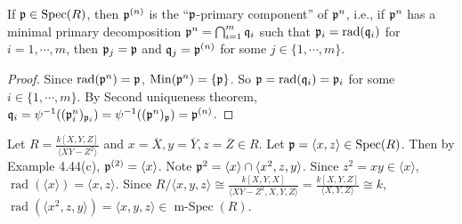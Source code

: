 \begin{proposition}
    If $\mathfrak{p} \in \operatorname{Spec}(R)$, then $\mathfrak{p}^{(n)}$ is the ``$\mathfrak{p}$-primary component'' of $\mathfrak{p}^{n}$, i.e., if $\mathfrak{p}^{n}$ has a minimal primary decomposition $\mathfrak{p}^{n} = \bigcap_{i=1}^{m} \mathfrak{q}_i$ such that $\mathfrak{p}_i = \operatorname{rad}(\mathfrak{q}_i)$ for $i = 1,\cdots,m$, then $\mathfrak{p}_j = \mathfrak{p}$ and $\mathfrak{q}_j = \mathfrak{p}^{(n)}$ for some $j \in \{1,\cdots,m\}$. 
\end{proposition}

\begin{proof}
    Since $\operatorname{rad}(\mathfrak{p}^{n}) = \mathfrak{p}$, $\operatorname{Min}(\mathfrak{p}^{n}) = \{\mathfrak{p}\}$. So $\mathfrak{p} = \operatorname{rad}(\mathfrak{q}_i) = \mathfrak{p}_i$ for some $i \in \{1,\cdots,m\}$. By Second uniqueness theorem, $\mathfrak{q}_i = \psi^{-1}((\mathfrak{p}_i^{n})_{\mathfrak{p}_i}) = \psi^{-1}((\mathfrak{p}^{n})_{\mathfrak{p}}) = \mathfrak{p}^{(n)}$.
\end{proof}

\begin{example}
    Let $R = \frac{k[X,Y,Z]}{\langle XY-Z^{2} \rangle}$ and $x = \overbar{X}, y = \overbar{Y}, z = \overbar{Z} \in R$. Let $\mathfrak{p} = \langle x,z \rangle \in \operatorname{Spec}(R)$. Then by Example 4.44(c), $\mathfrak{p}^{(2)} = \langle x \rangle$. Note $\mathfrak{p}^{2} = \langle x \rangle \cap \langle x^{2},z,y \rangle$. Since $z^{2} = xy \in \langle x \rangle$, $\operatorname{rad}(\langle x \rangle) = \langle x,z \rangle$. Since $R/\langle x,y,z \rangle \cong \frac{k[X,Y,X]}{\langle XY-Z^{2},X,Y,Z \rangle} = \frac{k[X,Y,Z]}{\langle X,Y,Z \rangle} \cong k$, $\operatorname{rad}(\langle x^{2},z,y \rangle) = \langle x,y,z \rangle \in \operatorname{m-Spec}(R)$.
\end{example}

\begin{definition}
\end{definition}

